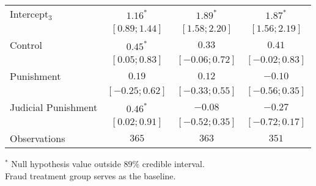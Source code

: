 \begin{table}[h]
\begin{center}
\begin{threeparttable}
\begin{tabular}{l c c c}
Intercept$_3$       & $1.16^{*}$        & $1.89^{*}$        & $1.87^{*}$        \\
                    & $ [ 0.89;  1.44]$ & $ [ 1.58;  2.20]$ & $ [ 1.56;  2.19]$ \\
Control             & $0.45^{*}$        & $0.33$            & $0.41$            \\
                    & $ [ 0.05;  0.83]$ & $ [-0.06;  0.72]$ & $ [-0.02;  0.83]$ \\
Punishment          & $0.19$            & $0.12$            & $-0.10$           \\
                    & $ [-0.25;  0.62]$ & $ [-0.33;  0.55]$ & $ [-0.56;  0.35]$ \\
Judicial Punishment & $0.46^{*}$        & $-0.08$           & $-0.27$           \\
                    & $ [ 0.02;  0.91]$ & $ [-0.52;  0.35]$ & $ [-0.72;  0.17]$ \\
\hline
Observations        & $365$             & $363$             & $351$             \\
\hline
\end{tabular}
\begin{tablenotes}[flushleft]
\scriptsize{$^*$ Null hypothesis value outside 89\% credible interval.  \\
Fraud treatment group serves as the baseline.}
\end{tablenotes}
\end{threeparttable}
\label{table:coefficients}
\end{center}
\end{table}
